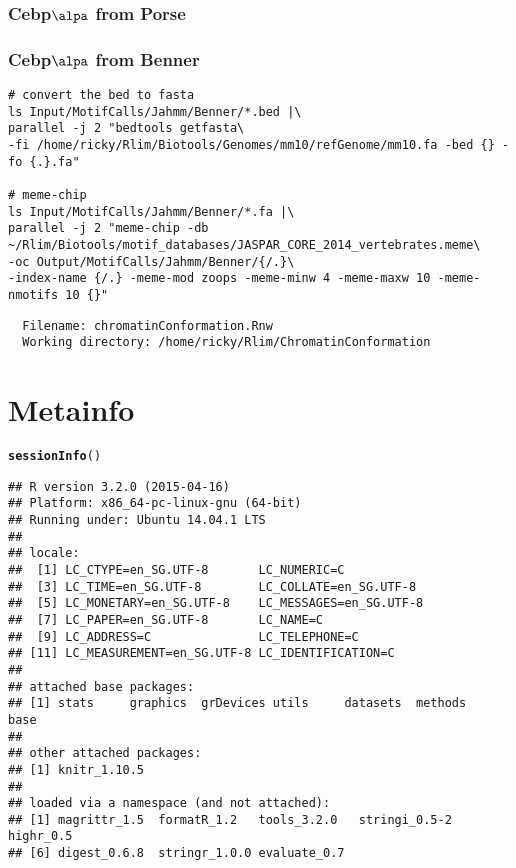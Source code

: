 \documentclass{article}\usepackage[]{graphicx}\usepackage[]{color}
\makeatletter
\newcommand{\hlstd}[1]{\textcolor[rgb]{0.345,0.345,0.345}{#1}}%
\newcommand{\hlkwd}[1]{\textcolor[rgb]{0.737,0.353,0.396}{\textbf{#1}}}%
\newenvironment{kframe}{%
 \def\at@end@of@kframe{}%
 \ifinner\ifhmode%
  \def\at@end@of@kframe{\end{minipage}}%
  \begin{minipage}{\columnwidth}%
 \fi\fi%
 \def\FrameCommand##1{\hskip\@totalleftmargin \hskip-\fboxsep
 \colorbox{shadecolor}{##1}\hskip-\fboxsep
     \hskip-\linewidth \hskip-\@totalleftmargin \hskip\columnwidth}%
 \MakeFramed {\advance\hsize-\width
   \@totalleftmargin\z@ \linewidth\hsize
   \@setminipage}}%
 {\par\unskip\endMakeFramed%
 \at@end@of@kframe}
\newenvironment{knitrout}{}{} %
\makeatother
\begin{document}
\subsubsection{Cebp$\alpa$ from Porse}

\subsubsection{Cebp$\alpa$ from Benner}
\begin{verbatim}
# convert the bed to fasta
ls Input/MotifCalls/Jahmm/Benner/*.bed |\ 
parallel -j 2 "bedtools getfasta\ 
-fi /home/ricky/Rlim/Biotools/Genomes/mm10/refGenome/mm10.fa -bed {} -fo {.}.fa"

# meme-chip
ls Input/MotifCalls/Jahmm/Benner/*.fa |\ 
parallel -j 2 "meme-chip -db ~/Rlim/Biotools/motif_databases/JASPAR_CORE_2014_vertebrates.meme\ 
-oc Output/MotifCalls/Jahmm/Benner/{/.}\ 
-index-name {/.} -meme-mod zoops -meme-minw 4 -meme-maxw 10 -meme-nmotifs 10 {}"
\end{verbatim}

\begin{verbatim}
  Filename: chromatinConformation.Rnw
  Working directory: /home/ricky/Rlim/ChromatinConformation 
\end{verbatim}

\section{Metainfo}
\begin{knitrout}
\definecolor{shadecolor}{rgb}{0.969, 0.969, 0.969}\color{fgcolor}\begin{kframe}
\begin{alltt}
\hlkwd{sessionInfo}\hlstd{()}
\end{alltt}
\begin{verbatim}
## R version 3.2.0 (2015-04-16)
## Platform: x86_64-pc-linux-gnu (64-bit)
## Running under: Ubuntu 14.04.1 LTS
## 
## locale:
##  [1] LC_CTYPE=en_SG.UTF-8       LC_NUMERIC=C              
##  [3] LC_TIME=en_SG.UTF-8        LC_COLLATE=en_SG.UTF-8    
##  [5] LC_MONETARY=en_SG.UTF-8    LC_MESSAGES=en_SG.UTF-8   
##  [7] LC_PAPER=en_SG.UTF-8       LC_NAME=C                 
##  [9] LC_ADDRESS=C               LC_TELEPHONE=C            
## [11] LC_MEASUREMENT=en_SG.UTF-8 LC_IDENTIFICATION=C       
## 
## attached base packages:
## [1] stats     graphics  grDevices utils     datasets  methods   base     
## 
## other attached packages:
## [1] knitr_1.10.5
## 
## loaded via a namespace (and not attached):
## [1] magrittr_1.5  formatR_1.2   tools_3.2.0   stringi_0.5-2 highr_0.5    
## [6] digest_0.6.8  stringr_1.0.0 evaluate_0.7
\end{verbatim}
\end{kframe}
\end{knitrout}
\end{document}
